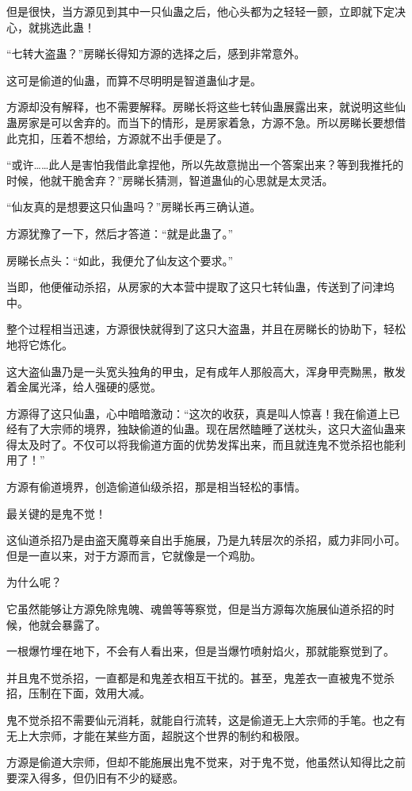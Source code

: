 \begin{this_body}
但是很快，当方源见到其中一只仙蛊之后，他心头都为之轻轻一颤，立即就下定决心，就挑选此蛊！

“七转大盗蛊？”房睇长得知方源的选择之后，感到非常意外。

这可是偷道的仙蛊，而算不尽明明是智道蛊仙才是。

方源却没有解释，也不需要解释。房睇长将这些七转仙蛊展露出来，就说明这些仙蛊房家是可以舍弃的。而当下的情形，是房家着急，方源不急。所以房睇长要想借此克扣，压着不想给，方源就不出手便是了。

“或许……此人是害怕我借此拿捏他，所以先故意抛出一个答案出来？等到我推托的时候，他就干脆舍弃？”房睇长猜测，智道蛊仙的心思就是太灵活。

“仙友真的是想要这只仙蛊吗？”房睇长再三确认道。

方源犹豫了一下，然后才答道：“就是此蛊了。”

房睇长点头：“如此，我便允了仙友这个要求。”

当即，他便催动杀招，从房家的大本营中提取了这只七转仙蛊，传送到了问津坞中。

整个过程相当迅速，方源很快就得到了这只大盗蛊，并且在房睇长的协助下，轻松地将它炼化。

这大盗仙蛊乃是一头宽头独角的甲虫，足有成年人那般高大，浑身甲壳黝黑，散发着金属光泽，给人强硬的感觉。

方源得了这只仙蛊，心中暗暗激动：“这次的收获，真是叫人惊喜！我在偷道上已经有了大宗师的境界，独缺偷道的仙蛊。现在居然瞌睡了送枕头，这只大盗仙蛊来得太及时了。不仅可以将我偷道方面的优势发挥出来，而且就连鬼不觉杀招也能利用了！”

方源有偷道境界，创造偷道仙级杀招，那是相当轻松的事情。

最关键的是鬼不觉！

这仙道杀招乃是由盗天魔尊亲自出手施展，乃是九转层次的杀招，威力非同小可。但是一直以来，对于方源而言，它就像是一个鸡肋。

为什么呢？

它虽然能够让方源免除鬼魄、魂兽等等察觉，但是当方源每次施展仙道杀招的时候，他就会暴露了。

一根爆竹埋在地下，不会有人看出来，但是当爆竹喷射焰火，那就能察觉到了。

并且鬼不觉杀招，一直都是和鬼差衣相互干扰的。甚至，鬼差衣一直被鬼不觉杀招，压制在下面，效用大减。

鬼不觉杀招不需要仙元消耗，就能自行流转，这是偷道无上大宗师的手笔。也之有无上大宗师，才能在某些方面，超脱这个世界的制约和极限。

方源是偷道大宗师，但却不能施展出鬼不觉来，对于鬼不觉，他虽然认知得比之前要深入得多，但仍旧有不少的疑惑。


\end{this_body}
